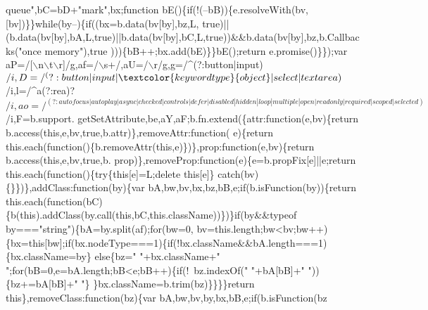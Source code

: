 \begin{DoxyCode}
{      queue"},bC=bD+\textcolor{stringliteral}{"mark"},bx;\textcolor{keyword}{function} bE()\{\textcolor{keywordflow}{if}(!(--bB))\{e.resolveWith(bv,[bv])\}\}\textcolor{keywordflow}{while}(by--)\{\textcolor{keywordflow}{if}((bx=b.data(bv[by],bz,L,\textcolor{keyword}{
      true})||(b.data(bv[by],bA,L,\textcolor{keyword}{true})||b.data(bv[by],bC,L,\textcolor{keyword}{true}))&&b.data(bv[by],bz,b.Callbacks(\textcolor{stringliteral}{"once memory"}),\textcolor{keyword}{true}
      )))\{bB++;bx.add(bE)\}\}bE();\textcolor{keywordflow}{return} e.promise()\}\});var aP=/[\(\backslash\)n\(\backslash\)t\(\backslash\)r]/g,af=/\(\backslash\)s+/,aU=/\(\backslash\)r/g,g=/^(?:button|input)$/i
      ,D=/^(?:button|input|\textcolor{keywordtype}{object}|select|textarea)$/i,l=/^a(?:rea)?$/i,ao=/^(?:autofocus|autoplay|async|checked|
      controls|defer|disabled|hidden|loop|multiple|open|readonly|required|scoped|selected)$/i,F=b.support.
      getSetAttribute,be,aY,aF;b.fn.extend(\{attr:function(e,bv)\{return b.access(this,e,bv,true,b.attr)\},removeAttr:\textcolor{keyword}{function}(
      e)\{return this.each(function()\{b.removeAttr(this,e)\})\},prop:\textcolor{keyword}{function}(e,bv)\{\textcolor{keywordflow}{return} b.access(\textcolor{keyword}{this},e,bv,\textcolor{keyword}{true},b.
      prop)\},removeProp:\textcolor{keyword}{function}(e)\{e=b.propFix[e]||e;\textcolor{keywordflow}{return} this.each(\textcolor{keyword}{function}()\{\textcolor{keywordflow}{try}\{\textcolor{keyword}{this}[e]=L;\textcolor{keyword}{delete} \textcolor{keyword}{this}[e]\}\textcolor{keywordflow}{
      catch}(bv)\{\}\})\},addClass:\textcolor{keyword}{function}(by)\{var bA,bw,bv,bx,bz,bB,e;\textcolor{keywordflow}{if}(b.isFunction(by))\{\textcolor{keywordflow}{return} this.each(\textcolor{keyword}{function}(bC)
      \{b(\textcolor{keyword}{this}).addClass(by.call(\textcolor{keyword}{this},bC,\textcolor{keyword}{this}.className))\})\}\textcolor{keywordflow}{if}(by&&typeof by===\textcolor{stringliteral}{"string"})\{bA=by.split(af);\textcolor{keywordflow}{for}(bw=0,
      bv=this.length;bw<bv;bw++)\{bx=\textcolor{keyword}{this}[bw];\textcolor{keywordflow}{if}(bx.nodeType===1)\{\textcolor{keywordflow}{if}(!bx.className&&bA.length===1)\{bx.className=by\}\textcolor{keywordflow}{
      else}\{bz=\textcolor{stringliteral}{" "}+bx.className+\textcolor{stringliteral}{" "};\textcolor{keywordflow}{for}(bB=0,e=bA.length;bB<e;bB++)\{\textcolor{keywordflow}{if}(!~bz.indexOf(\textcolor{stringliteral}{" "}+bA[bB]+\textcolor{stringliteral}{" "}))\{bz+=bA[bB]+\textcolor{stringliteral}{" "}\}
      \}bx.className=b.trim(bz)\}\}\}\}\textcolor{keywordflow}{return} \textcolor{keyword}{this}\},removeClass:\textcolor{keyword}{function}(bz)\{var bA,bw,bv,by,bx,bB,e;\textcolor{keywordflow}{if}(b.isFunction(bz

\end{DoxyCode}
